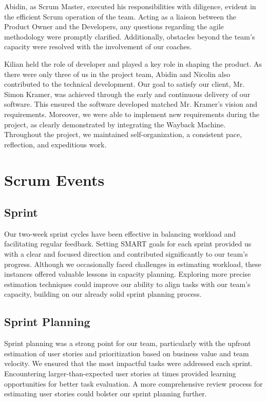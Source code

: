 Abidin, as Scrum Master, executed his responsibilities with diligence, evident in the efficient Scrum operation of the team.
Acting as a liaison between the Product Owner and the Developers, any questions regarding the agile methodology were promptly clarified.
Additionally, obstacles beyond the team's capacity were resolved with the involvement of our coaches.

Kilian held the role of developer and played a key role in shaping the product.
As there were only three of us in the project team, Abidin and Nicolin also contributed to the technical development.
Our goal to satisfy our client, Mr. Simon Kramer, was achieved through the early and continuous delivery of our software.
This ensured the software developed matched Mr. Kramer's vision and requirements.
Moreover, we were able to implement new requirements during the project, as clearly demonstrated by integrating the Wayback Machine.
Throughout the project, we maintained self-organization, a consistent pace, reflection, and expeditious work.


\section{Scrum Events}

\subsection{Sprint}
Our two-week sprint cycles have been effective in balancing workload and facilitating regular feedback.
Setting SMART goals for each sprint provided us with a clear and focused direction and contributed significantly to our team's progress.
Although we occasionally faced challenges in estimating workload, these instances offered valuable lessons in capacity planning.
Exploring more precise estimation techniques could improve our ability to align tasks with our team's capacity, building on our already solid sprint planning process.

\subsection{Sprint Planning}
Sprint planning was a strong point for our team, particularly with the upfront estimation of user stories and prioritization based on business value and team velocity.
We ensured that the most impactful tasks were addressed each sprint.
Encountering larger-than-expected user stories at times provided learning opportunities for better task evaluation.
A more comprehensive review process for estimating user stories could bolster our sprint planning further.

